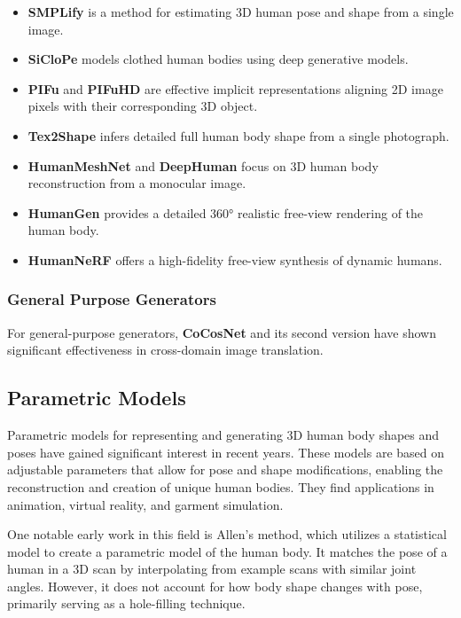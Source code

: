 \begin{itemize}
	\item \textbf{SMPLify} \cite{SMPLify} is a method for estimating 3D human pose and shape from a single image.
	\item \textbf{SiCloPe} \cite{SiCloPe} models clothed human bodies using deep generative models.
	\item \textbf{PIFu} and \textbf{PIFuHD} \cite{PIFu, PIFuHD} are effective implicit representations aligning 2D image pixels with their corresponding 3D object.
	\item \textbf{Tex2Shape} \cite{Tex2Shape} infers detailed full human body shape from a single photograph.
	\item \textbf{HumanMeshNet} \cite{HumanMeshNet} and \textbf{DeepHuman} \cite{DeepHuman} focus on 3D human body reconstruction from a monocular image.
	\item \textbf{HumanGen} \cite{humangen} provides a detailed 360° realistic free-view rendering of the human body.
	\item \textbf{HumanNeRF} \cite{humannerf} offers a high-fidelity free-view synthesis of dynamic humans.
\end{itemize}

\subsubsection{General Purpose Generators}

For general-purpose generators, \textbf{CoCosNet} and its second version
\cite{CoCosNet, CoCosNet2} have shown significant effectiveness in cross-domain
image translation.

\subsection{Parametric Models}

Parametric models for representing and generating 3D human body shapes and
poses have gained significant interest in recent years. These models are based
on adjustable parameters that allow for pose and shape modifications, enabling
the reconstruction and creation of unique human bodies. They find applications
in animation, virtual reality, and garment simulation.

One notable early work in this field is Allen's method, which utilizes a
statistical model to create a parametric model of the human body. It matches
the pose of a human in a 3D scan by interpolating from example scans with
similar joint angles. However, it does not account for how body shape changes
with pose, primarily serving as a hole-filling technique.

